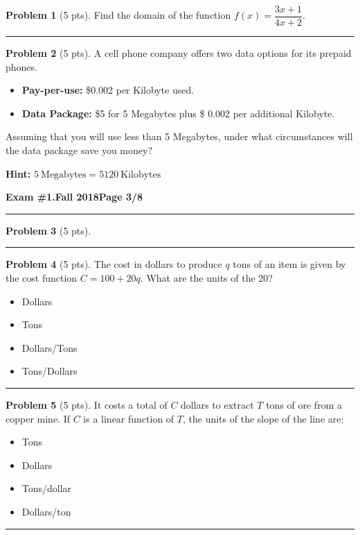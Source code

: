 \documentclass[12pt]{article}
\makeatletter
\theoremstyle{definition}
\newtheorem{problem}{Problem}
\newcommand*{\radiobutton}{%
  \@ifstar{\@radiobutton0}{\@radiobutton1}%
}
\newcommand*{\@radiobutton}[1]{%
  \begin{tikzpicture}
    \pgfmathsetlengthmacro\radius{height("X")/2}
    \draw[radius=\radius] circle;
    \ifcase#1 \fill[radius=.6*\radius] circle;\fi
  \end{tikzpicture}%
}
\makeatother
\begin{document}
\begin{problem}[5 pts]
  Find the domain of the function $f(x) = \dfrac{3x+1}{4x+2}$.

  \vspace{2cm}
\end{problem}
\hrule

\begin{problem}[5 pts]
  A cell phone company offers two data options for its prepaid phones.
  \begin{itemize}
  \item \textbf{Pay-per-use:} \$0.002 per Kilobyte used.
  \item \textbf{Data Package:} \$5 for 5 Megabytes plus \$ 0.002 per additional Kilobyte.
  \end{itemize}
  Assuming that you will use less than 5 Megabytes, under what circumstances will the data package save you money?

  \textbf{Hint:} $5~\text{Megabytes} = 5120~\text{Kilobytes}$
\end{problem}

\newpage

\hfill{\large\bf Exam \#1.}\hfill{\large\bf  Fall 2018}\hfill{\large\bf Page 3/8}\hrule

\bigskip
\begin{problem}[5 pts]
  
\end{problem}
\hrule

\begin{problem}[5 pts]
  The cost in dollars to produce $q$ tons of an item is given by the cost function $C = 100 + 20q$. What are the units of
  the 20? 
  \begin{itemize}
  \item[\radiobutton] Dollars
  \item[\radiobutton] Tons
  \item[\radiobutton] Dollars/Tons
  \item[\radiobutton] Tons/Dollars
  \end{itemize} 
\end{problem}
\hrule

\begin{problem}[5 pts]
  It costs a total of $C$ dollars to extract $T$ tons of ore from a copper mine. If $C$ is a linear function of $T$, the
  units of the slope of the line are: 
  \begin{itemize}
  \item[\radiobutton] Tons
  \item[\radiobutton] Dollars
  \item[\radiobutton] Tons/dollar
  \item[\radiobutton] Dollars/ton
  \end{itemize}
\end{problem}
\hrule
\end{document}
